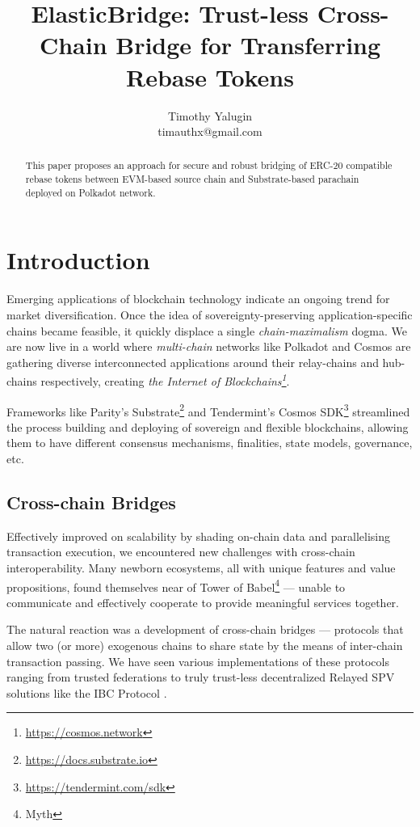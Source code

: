 \documentclass{article}
\title{ElasticBridge: Trust-less Cross-Chain Bridge for Transferring Rebase Tokens}
\author{Timothy Yalugin\\timauthx@gmail.com}
\begin{document}
\maketitle

\begin{abstract}

This paper proposes an approach for secure and robust bridging of ERC-20 compatible rebase tokens between EVM-based source chain and Substrate-based parachain deployed on Polkadot network.

\end{abstract}

\section{Introduction}

Emerging applications of blockchain technology indicate an ongoing trend for market diversification. Once the idea of sovereignty-preserving application-specific chains became feasible, it quickly displace a single \textit{chain-maximalism} dogma. We are now live in a world where \textit{multi-chain} networks like Polkadot \cite{wood2016polkadot} and Cosmos \cite{kwon2016cosmos} are gathering diverse interconnected applications around their relay-chains and hub-chains respectively, creating \textit{the Internet of Blockchains\footnote{\url{https://cosmos.network}}}.

Frameworks like Parity's Substrate\footnote{\url{https://docs.substrate.io}} and Tendermint's Cosmos SDK\footnote{\url{https://tendermint.com/sdk}} streamlined the process building and deploying of sovereign and flexible blockchains, allowing them to have different consensus mechanisms, finalities, state models, governance, etc.

\subsection{Cross-chain Bridges}

Effectively improved on scalability by shading on-chain data and parallelising transaction execution, we encountered new challenges with cross-chain interoperability. Many newborn ecosystems, all with unique features and value propositions, found themselves near of Tower of Babel\footnote{Myth} --- unable to communicate and effectively cooperate to provide meaningful services together.

The natural reaction was a development of cross-chain bridges --- protocols that allow two (or more) exogenous chains to share state by the means of inter-chain transaction passing. We have seen various implementations of these protocols ranging from trusted federations to truly trust-less decentralized Relayed SPV solutions like the IBC Protocol \cite{goes2020ibc}.
\end{document}

